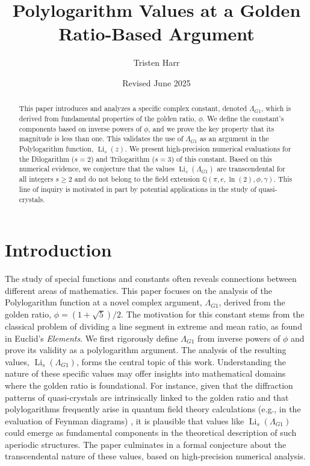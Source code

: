 \documentclass{amsart}
\theoremstyle{plain}
\theoremstyle{definition}
\theoremstyle{remark}
\DeclareMathOperator{\Li}{Li} %
\newcommand{\LambdaG}{\Lambda_{G1}}
\newcommand{\phiG}{\phi}
\begin{document}
\title[Polylogarithms at a Golden Ratio Argument]{Polylogarithm Values at a Golden Ratio-Based Argument}
\author{Tristen Harr}
\date{Revised June 2025}

\begin{abstract}
This paper introduces and analyzes a specific complex constant, denoted $\LambdaG$, which is derived from fundamental properties of the golden ratio, $\phiG$. We define the constant's components based on inverse powers of $\phiG$, and we prove the key property that its magnitude is less than one. This validates the use of $\LambdaG$ as an argument in the Polylogarithm function, $\Li_s(z)$. We present high-precision numerical evaluations for the Dilogarithm ($s=2$) and Trilogarithm ($s=3$) of this constant. Based on this numerical evidence, we conjecture that the values $\Li_s(\LambdaG)$ are transcendental for all integers $s \ge 2$ and do not belong to the field extension $\mathbb{Q}(\pi, e, \ln(2), \phiG, \gamma)$. This line of inquiry is motivated in part by potential applications in the study of quasi-crystals.
\end{abstract}

\maketitle

\section{Introduction}
The study of special functions and constants often reveals connections between different areas of mathematics. This paper focuses on the analysis of the Polylogarithm function at a novel complex argument, $\LambdaG$, derived from the golden ratio, $\phiG = (1+\sqrt{5})/2$. The motivation for this constant stems from the classical problem of dividing a line segment in extreme and mean ratio, as found in Euclid's \textit{Elements}. We first rigorously define $\LambdaG$ from inverse powers of $\phiG$ and prove its validity as a polylogarithm argument. The analysis of the resulting values, $\Li_s(\LambdaG)$, forms the central topic of this work. Understanding the nature of these specific values may offer insights into mathematical domains where the golden ratio is foundational. For instance, given that the diffraction patterns of quasi-crystals are intrinsically linked to the golden ratio  and that polylogarithms frequently arise in quantum field theory calculations (e.g., in the evaluation of Feynman diagrams) , it is plausible that values like $\Li_s(\LambdaG)$ could emerge as fundamental components in the theoretical description of such aperiodic structures. The paper culminates in a formal conjecture about the transcendental nature of these values, based on high-precision numerical analysis.
\end{document}
